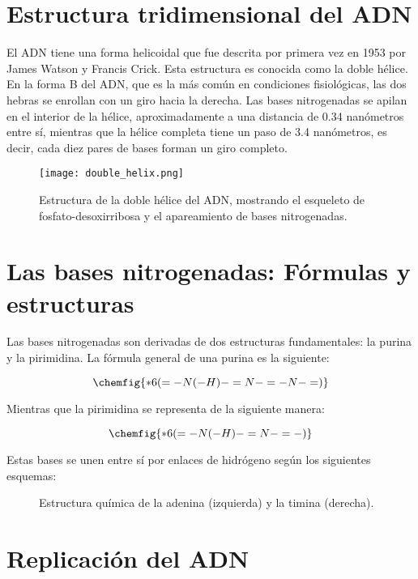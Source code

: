 \section{Estructura tridimensional del ADN}

El ADN tiene una forma helicoidal que fue descrita por primera vez en 1953 por James Watson y Francis Crick. Esta estructura es conocida como la doble hélice. En la forma B del ADN, que es la más común en condiciones fisiológicas, las dos hebras se enrollan con un giro hacia la derecha. Las bases nitrogenadas se apilan en el interior de la hélice, aproximadamente a una distancia de 0.34 nanómetros entre sí, mientras que la hélice completa tiene un paso de 3.4 nanómetros, es decir, cada diez pares de bases forman un giro completo.

\begin{figure}[h!]
\centering
\texttt{[image: double\_helix.png]}
\caption{Estructura de la doble hélice del ADN, mostrando el esqueleto de fosfato-desoxirribosa y el apareamiento de bases nitrogenadas.}
\end{figure}

\section{Las bases nitrogenadas: Fórmulas y estructuras}

Las bases nitrogenadas son derivadas de dos estructuras fundamentales: la purina y la pirimidina. La fórmula general de una purina es la siguiente:

\begin{equation*}
\chemfig{*6(=-N(-H)-=N-=-N-=)}
\end{equation*}

Mientras que la pirimidina se representa de la siguiente manera:

\begin{equation*}
\chemfig{*6(=-N(-H)-=N-=-)}
\end{equation*}

Estas bases se unen entre sí por enlaces de hidrógeno según los siguientes esquemas:

\begin{figure}[h!]
\centering
{}
\quad
{}
\caption{Estructura química de la adenina (izquierda) y la timina (derecha).}
\end{figure}

\section{Replicación del ADN}

